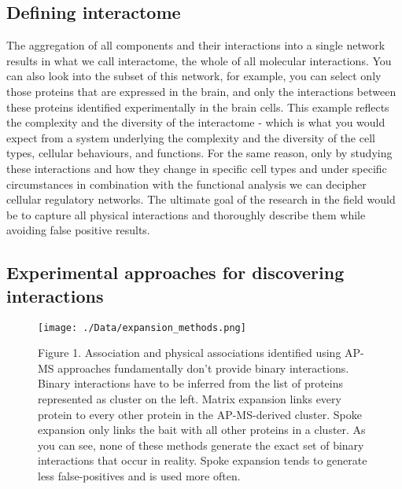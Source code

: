 \documentclass[12pt,]{report}
\begin{document}
\subsection{Defining interactome}\label{defining-interactome}

The aggregation of all components and their interactions into a single
network results in what we call interactome, the whole of all molecular
interactions. You can also look into the subset of this network, for
example, you can select only those proteins that are expressed in the
brain, and only the interactions between these proteins identified
experimentally in the brain cells. This example reflects the complexity
and the diversity of the interactome - which is what you would expect
from a system underlying the complexity and the diversity of the cell
types, cellular behaviours, and functions. For the same reason, only by
studying these interactions and how they change in specific cell types
and under specific circumstances in combination with the functional
analysis we can decipher cellular regulatory networks. The ultimate goal
of the research in the field would be to capture all physical
interactions and thoroughly describe them while avoiding false positive
results.

\subsection{Experimental approaches for discovering
interactions}\label{experimental-approaches-for-discovering-interactions}

\begin{figure}
\centering
\texttt{[image: ./Data/expansion\_methods.png]}
\caption{Figure 1. Association and physical associations identified
using AP-MS approaches fundamentally don't provide binary interactions.
Binary interactions have to be inferred from the list of proteins
represented as cluster on the left. Matrix expansion links every protein
to every other protein in the AP-MS-derived cluster. Spoke expansion
only links the bait with all other proteins in a cluster. As you can
see, none of these methods generate the exact set of binary interactions
that occur in reality. Spoke expansion tends to generate less
false-positives and is used more often.}
\end{figure}
\end{document}
